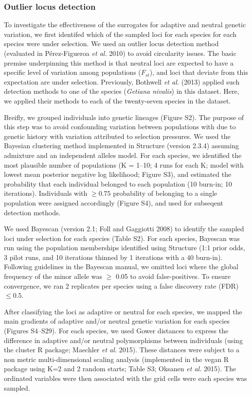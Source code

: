 \documentclass[11pt,]{article}
\begin{document}
\subsubsection{Outlier locus detection}\label{outlier-locus-detection}

To investigate the effectiveness of the surrogates for adaptive and
neutral genetic variation, we first identifed which of the sampled loci
for each species for each species were under selection. We used an
outlier locus detection method (evaluated in P{é}rez-Figueroa \emph{et
al.} 2010) to avoid circularity issues. The basic premise underpinning
this method is that neutral loci are expected to have a specific level
of variation among populations ($F_{st}$), and loci that deviate from
this expectation are under selection. Previously, Bothwell \emph{et al.}
(2013) applied such detection methods to one of the species
(\emph{Getiana nivalis}) in this dataset. Here, we applied their methods
to each of the twenty-seven species in the dataset.

Breifly, we grouped individuals into genetic lineages (Figure S2). The
purpose of this step was to avoid confounding variation between
populations with due to genetic history with variation attributed to
selection pressures. We used the Bayesian clustering method implemented
in Structure (version 2.3.4) assuming admixture and an independent
alleles model. For each species, we identified the most plausible number
of populations (K = 1--10; 4 runs for each K; model with lowest mean
posterior negative log likelihood; Figure S3), and estimated the
probability that each individual belonged to each population (10
burn-in; 10 iterations). Individuals with $\geq 0.75$ probability of
belonging to a single population were assigned accordingly (Figure S4),
and used for subseqent detection methods.

We used Bayescan (version 2.1; Foll and Gaggiotti 2008) to identify the
sampled loci under selection for each species (Table S2). For each
species, Bayescan was run using the population memberships identified
using Structure (1:1 prior odds, 3 pilot runs, and 10 iterations thinned
by 1 iterations with a 40 burn-in). Following guidelines in the Bayescan
manual, we omitted loci where the global frequency of the minor allele
was $\geq$ 0.05 to avoid false-positives. To ensure convergence, we ran
2 replicates per species using a false discovery rate (FDR) $\leq 0.5$.

After classifying the loci as adaptive or neutral for each species, we
mapped the main gradients of adaptive and/or neutral genetic variation
for each species (Figures S4--S29). For each species, we used Gower
distances to express the difference in adaptive and/or neutral
polymorphisms between individuals (using the cluster R package; Maechler
\emph{et al.} 2015). These distances were subject to a non metric
multi-dimensional scaling analysis (implemented in the vegan R package
using K=2 and 2 random starts; Table S3; Oksanen \emph{et al.} 2015).
The ordinated variables were then associated with the grid cells were
each species was sampled.
\end{document}
